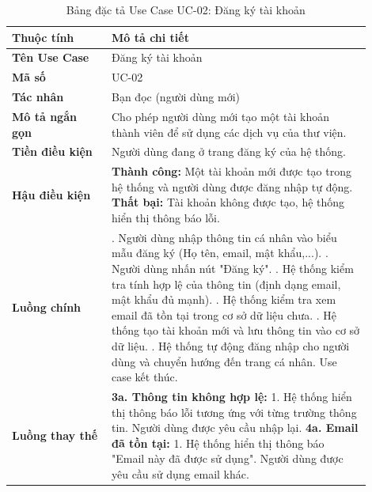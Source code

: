 \begin{table}[H]
\centering
\caption{Bảng đặc tả Use Case UC-02: Đăng ký tài khoản}
\label{tab:dt_dang_ky}
\begin{tabular}{|>{\raggedright\arraybackslash}p{0.25\linewidth}|>{\raggedright\arraybackslash}p{0.65\linewidth}|}
\hline
\textbf{Thuộc tính} & \textbf{Mô tả chi tiết} \\
\hline
\textbf{Tên Use Case} & Đăng ký tài khoản \\
\hline
\textbf{Mã số} & UC-02 \\
\hline
\textbf{Tác nhân} & Bạn đọc (người dùng mới) \\
\hline
\textbf{Mô tả ngắn gọn} & Cho phép người dùng mới tạo một tài khoản thành viên để sử dụng các dịch vụ của thư viện. \\
\hline
\textbf{Tiền điều kiện} & Người dùng đang ở trang đăng ký của hệ thống. \\
\hline
\textbf{Hậu điều kiện} & \textbf{Thành công:} Một tài khoản mới được tạo trong hệ thống và người dùng được đăng nhập tự động. \newline \textbf{Thất bại:} Tài khoản không được tạo, hệ thống hiển thị thông báo lỗi. \\
\hline
\textbf{Luồng chính} &
1. Người dùng nhập thông tin cá nhân vào biểu mẫu đăng ký (Họ tên, email, mật khẩu,...). \newline
2. Người dùng nhấn nút "Đăng ký". \newline
3. Hệ thống kiểm tra tính hợp lệ của thông tin (định dạng email, mật khẩu đủ mạnh). \newline
4. Hệ thống kiểm tra xem email đã tồn tại trong cơ sở dữ liệu chưa. \newline
5. Hệ thống tạo tài khoản mới và lưu thông tin vào cơ sở dữ liệu. \newline
6. Hệ thống tự động đăng nhập cho người dùng và chuyển hướng đến trang cá nhân. Use case kết thúc. \\
\hline
\textbf{Luồng thay thế} &
\textbf{3a. Thông tin không hợp lệ:} \newline
\hspace{1em} 1. Hệ thống hiển thị thông báo lỗi tương ứng với từng trường thông tin. Người dùng được yêu cầu nhập lại. \newline
\textbf{4a. Email đã tồn tại:} \newline
\hspace{1em} 1. Hệ thống hiển thị thông báo "Email này đã được sử dụng". Người dùng được yêu cầu sử dụng email khác. \\
\hline
\end{tabular}
\end{table}

